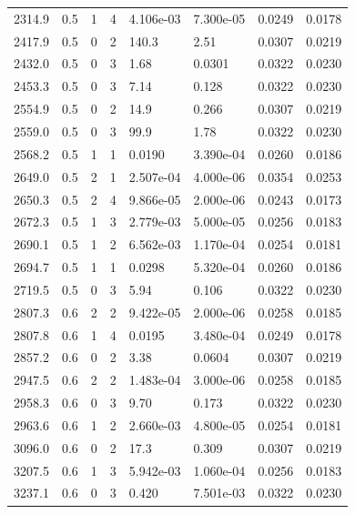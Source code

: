 \documentclass[preview]{standalone}
\begin{document}
{{{\begin{tabular}{L{1.2cm}C{1.2cm} C{0.3cm}C{0.5cm} C{1.4cm}C{1.4cm} C{1.4cm}C{1.4cm}}
  2314.9  &   0.5  & 1     &  4 &  4.106e-03  & 7.300e-05  & 0.0249 &  0.0178   \\ 
  2417.9  &   0.5  & 0     &  2 &  140.3  & 2.51  & 0.0307 &  0.0219   \\ 
  2432.0  &   0.5  & 0     &  3 &  1.68  & 0.0301  & 0.0322 &  0.0230   \\ 
  2453.3  &   0.5  & 0     &  3 &  7.14  & 0.128  & 0.0322 &  0.0230   \\ 
  2554.9  &   0.5  & 0     &  2 &  14.9  & 0.266  & 0.0307 &  0.0219   \\ 
  2559.0  &   0.5  & 0     &  3 &  99.9  & 1.78  & 0.0322 &  0.0230   \\ 
  2568.2  &   0.5  & 1     &  1 &  0.0190  & 3.390e-04  & 0.0260 &  0.0186   \\ 
  2649.0  &   0.5  & 2     &  1 &  2.507e-04  & 4.000e-06  & 0.0354 &  0.0253   \\ 
  2650.3  &   0.5  & 2     &  4 &  9.866e-05  & 2.000e-06  & 0.0243 &  0.0173   \\ 
  2672.3  &   0.5  & 1     &  3 &  2.779e-03  & 5.000e-05  & 0.0256 &  0.0183   \\ 
  2690.1  &   0.5  & 1     &  2 &  6.562e-03  & 1.170e-04  & 0.0254 &  0.0181   \\ 
  2694.7  &   0.5  & 1     &  1 &  0.0298  & 5.320e-04  & 0.0260 &  0.0186   \\ 
  2719.5  &   0.5  & 0     &  3 &  5.94  & 0.106  & 0.0322 &  0.0230   \\ 
  2807.3  &   0.6  & 2     &  2 &  9.422e-05  & 2.000e-06  & 0.0258 &  0.0185   \\ 
  2807.8  &   0.6  & 1     &  4 &  0.0195  & 3.480e-04  & 0.0249 &  0.0178   \\ 
  2857.2  &   0.6  & 0     &  2 &  3.38  & 0.0604  & 0.0307 &  0.0219   \\ 
  2947.5  &   0.6  & 2     &  2 &  1.483e-04  & 3.000e-06  & 0.0258 &  0.0185   \\ 
  2958.3  &   0.6  & 0     &  3 &  9.70  & 0.173  & 0.0322 &  0.0230   \\ 
  2963.6  &   0.6  & 1     &  2 &  2.660e-03  & 4.800e-05  & 0.0254 &  0.0181   \\ 
  3096.0  &   0.6  & 0     &  2 &  17.3  & 0.309  & 0.0307 &  0.0219   \\ 
  3207.5  &   0.6  & 1     &  3 &  5.942e-03  & 1.060e-04  & 0.0256 &  0.0183   \\ 
  3237.1  &   0.6  & 0     &  3 &  0.420  & 7.501e-03  & 0.0322 &  0.0230   \\ 

\end{tabular}}}}
\end{document}
